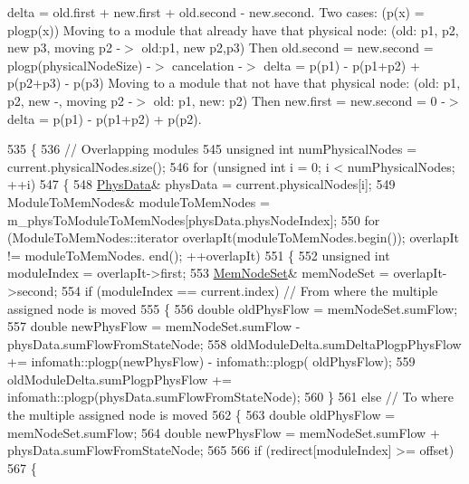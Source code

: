 delta = old.\+first + new.\+first + old.\+second -\/ new.\+second. Two cases\+: (p(x) = plogp(x)) Moving to a module that already have that physical node\+: (old\+: p1, p2, new p3, moving p2 -\/$>$ old\+:p1, new p2,p3) Then old.\+second = new.\+second = plogp(physical\+Node\+Size) -\/$>$ cancelation -\/$>$ delta = p(p1) -\/ p(p1+p2) + p(p2+p3) -\/ p(p3) Moving to a module that not have that physical node\+: (old\+: p1, p2, new -\/, moving p2 -\/$>$ old\+: p1, new\+: p2) Then new.\+first = new.\+second = 0 -\/$>$ delta = p(p1) -\/ p(p1+p2) + p(p2).
\begin{DoxyCode}
535 \{
536     \textcolor{comment}{// Overlapping modules}
545 \textcolor{comment}{}    \textcolor{keywordtype}{unsigned} \textcolor{keywordtype}{int} numPhysicalNodes = current.physicalNodes.size();
546     \textcolor{keywordflow}{for} (\textcolor{keywordtype}{unsigned} \textcolor{keywordtype}{int} i = 0; i < numPhysicalNodes; ++i)
547     \{
548         \mbox{\hyperlink{structPhysData}{PhysData}}& physData = current.physicalNodes[i];
549         ModuleToMemNodes& moduleToMemNodes = m\_physToModuleToMemNodes[physData.physNodeIndex];
550         \textcolor{keywordflow}{for} (ModuleToMemNodes::iterator overlapIt(moduleToMemNodes.begin()); overlapIt != moduleToMemNodes.
      end(); ++overlapIt)
551         \{
552             \textcolor{keywordtype}{unsigned} \textcolor{keywordtype}{int} moduleIndex = overlapIt->first;
553             \mbox{\hyperlink{structMemNodeSet}{MemNodeSet}}& memNodeSet = overlapIt->second;
554             \textcolor{keywordflow}{if} (moduleIndex == current.index) \textcolor{comment}{// From where the multiple assigned node is moved}
555             \{
556                 \textcolor{keywordtype}{double} oldPhysFlow = memNodeSet.sumFlow;
557                 \textcolor{keywordtype}{double} newPhysFlow = memNodeSet.sumFlow - physData.sumFlowFromStateNode;
558                 oldModuleDelta.sumDeltaPlogpPhysFlow += infomath::plogp(newPhysFlow) - infomath::plogp(
      oldPhysFlow);
559                 oldModuleDelta.sumPlogpPhysFlow += infomath::plogp(physData.sumFlowFromStateNode);
560             \}
561             \textcolor{keywordflow}{else} \textcolor{comment}{// To where the multiple assigned node is moved}
562             \{
563                 \textcolor{keywordtype}{double} oldPhysFlow = memNodeSet.sumFlow;
564                 \textcolor{keywordtype}{double} newPhysFlow = memNodeSet.sumFlow + physData.sumFlowFromStateNode;
565 
566                 \textcolor{keywordflow}{if} (redirect[moduleIndex] >= offset)
567                 \{

\end{DoxyCode}
